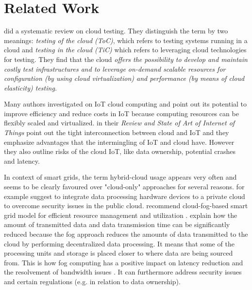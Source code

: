 \section{Related Work}

\citeauthor{bertolino2019systematic} did a systematic review on cloud testing. They distinguish the term by two meanings: \textit{testing of the cloud (ToC)}, which refers to testing systems running in a cloud and \textit{testing in the cloud (TiC)} which refers to leveraging cloud technologies for testing. They find that the cloud \textit{offers the possibility to develop and maintain costly test infrastructures and to leverage on-demand scalable resources for configuration (by using cloud virtualization) and performance (by means of cloud elasticity) testing.}

Many authors investigated on IoT cloud computing and point out its potential to improve efficiency and reduce costs in IoT because computing resources can be flexibly scaled and virtualized. \citeauthor{laghari2021review} in their \textit{Review and State of Art of Internet of Things} point out the tight interconnection between cloud and IoT and they emphasize advantages that the intermingling of IoT and cloud have. However they also outline risks of the cloud IoT, like data ownership, potential crashes and latency.

In context of smart grids, the term hybrid-cloud usage appears very often and seems to be clearly favoured over "cloud-only" approaches for several reasons. \citeauthor{talaat2020hybrid} for example suggest to integrate data processing hardware devices to a private cloud to overcome security issues in the public cloud. \citeauthor{zahoor2018cloudmanag} recommend cloud-fog-based smart grid model for efficient resource management \cite{zahoor2018cloudmanag} and utilization \cite{zahoor2018cloudutil}. \citeauthor{zahoor2018cloudmanag} explain how the amount of transmitted data and data transmission time can be significantly reduced because the fog approach reduces the amounts of data transmitted to the cloud by performing decentralized data processing. It means that some of the processing units and storage is placed closer to where data are being sourced from. This is how fog computing has a positive impact on latency reduction and the resolvement of bandwidth issues \cite{forcan2020cloud}. It can furthermore address security issues and certain regulations (e.g. in relation to data ownership).

